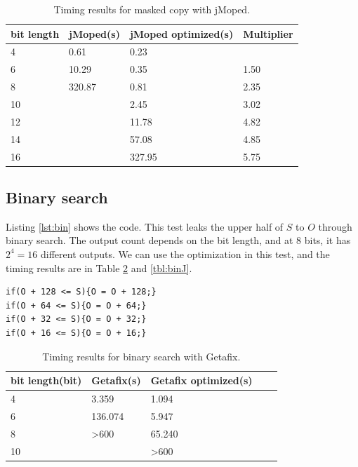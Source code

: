 \begin{table}[!h]
\begin{center}
\begin{tabular}{|l|l|l|l|}
\hline
bit length & jMoped(s) & jMoped optimized(s) & Multiplier \\ \hline
4 & 0.61 & 0.23 &  \\ \hline
6 & 10.29 & 0.35 & 1.50 \\ \hline
8 & 320.87 & 0.81 & 2.35 \\ \hline
10 &  & 2.45 & 3.02 \\ \hline
12 &  & 11.78 & 4.82 \\ \hline
14 &  & 57.08 & 4.85 \\ \hline
16 &  & 327.95 & 5.75 \\ \hline
\end{tabular}
\end{center}
\caption{Timing results for masked copy with jMoped.}
\label{tbl:maskedJ}
\end{table}

\subsection{Binary search}
Listing \ref{lst:bin} shows the code. This test leaks the upper half of $S$ to $O$ through binary search. The output count depends on the bit length, and at $8$ bits, it has $2^{4} = 16$ different outputs. We can use the optimization in this test, and the timing results are in Table \ref{tbl:binG} and \ref{tbl:binJ}.

\lstset{language=C} 
\begin{lstlisting}[float=!h, caption={Binary search test program at 8 bits.},label=lst:bin]
if(O + 128 <= S){O = O + 128;}
if(O + 64 <= S){O = O + 64;}
if(O + 32 <= S){O = O + 32;}
if(O + 16 <= S){O = O + 16;}
\end{lstlisting}

\begin{table}[!h]
\centering
\begin{tabular}{|l|l|l|l|l|}
\hline
{bit length(bit)} & Getafix(s) & {Getafix optimized(s)}  \\ \hline
4 & 3.359 & 1.094  \\ \hline
6 & 136.074 & 5.947  \\ \hline
8 & \textgreater 600 & 65.240  \\ \hline
10 &  & \textgreater 600 \\ \hline
\end{tabular}
\caption{Timing results for binary search with Getafix.}
\label{tbl:binG}
\end{table}

